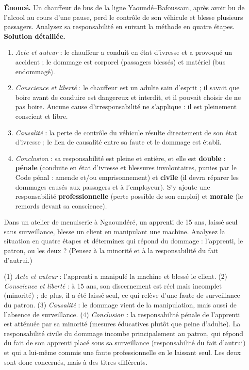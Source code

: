 \documentclass[11pt]{article}
\begin{document}
\begin{exoresolu}
\textbf{Énoncé.} Un chauffeur de bus de la ligne Yaoundé--Bafoussam, après avoir bu de l'alcool au cours d'une pause, perd le contrôle de son véhicule et blesse plusieurs passagers. Analysez sa responsabilité en suivant la méthode en quatre étapes.
\tcblower
\textbf{Solution détaillée.}
\begin{enumerate}
\item \emph{Acte et auteur} : le chauffeur a conduit en état d'ivresse et a provoqué un accident ; le dommage est corporel (passagers blessés) et matériel (bus endommagé).
\item \emph{Conscience et liberté} : le chauffeur est un adulte sain d'esprit ; il savait que boire avant de conduire est dangereux et interdit, et il pouvait choisir de ne pas boire. Aucune cause d'irresponsabilité ne s'applique : il est pleinement conscient et libre.
\item \emph{Causalité} : la perte de contrôle du véhicule résulte directement de son état d'ivresse ; le lien de causalité entre sa faute et le dommage est établi.
\item \emph{Conclusion} : sa responsabilité est pleine et entière, et elle est \textbf{double} : \textbf{pénale} (conduite en état d'ivresse et blessures involontaires, punies par le Code pénal : amende et/ou emprisonnement) et \textbf{civile} (il devra réparer les dommages causés aux passagers et à l'employeur). S'y ajoute une responsabilité \textbf{professionnelle} (perte possible de son emploi) et \textbf{morale} (le remords devant sa conscience).
\end{enumerate}
\end{exoresolu}

\begin{exercice}
Dans un atelier de menuiserie à Ngaoundéré, un apprenti de 15 ans, laissé seul sans surveillance, blesse un client en manipulant une machine. Analysez la situation en quatre étapes et déterminez qui répond du dommage : l'apprenti, le patron, ou les deux ? (Pensez à la minorité et à la responsabilité du fait d'autrui.)
\end{exercice}

\begin{corrige}
(1) \emph{Acte et auteur} : l'apprenti a manipulé la machine et blessé le client. (2) \emph{Conscience et liberté} : à 15 ans, son discernement est réel mais incomplet (minorité) ; de plus, il a été laissé seul, ce qui relève d'une faute de surveillance du patron. (3) \emph{Causalité} : le dommage vient de la manipulation, mais aussi de l'absence de surveillance. (4) \emph{Conclusion} : la responsabilité pénale de l'apprenti est atténuée par sa minorité (mesures éducatives plutôt que peine d'adulte). La responsabilité civile du dommage incombe principalement au patron, qui répond du fait de son apprenti placé sous sa surveillance (responsabilité du fait d'autrui) et qui a lui-même commis une faute professionnelle en le laissant seul. Les deux sont donc concernés, mais à des titres différents.
\end{corrige}
\end{document}
